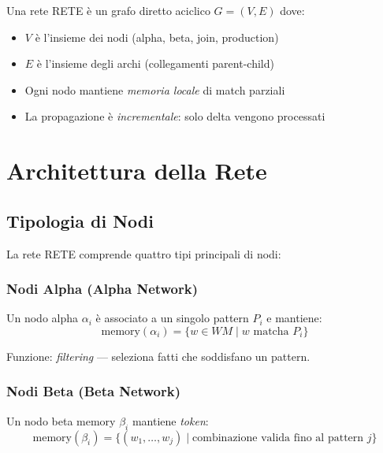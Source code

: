 \begin{definizione}
Una rete RETE è un grafo diretto aciclico $G = (V, E)$ dove:
\begin{itemize}
\item $V$ è l'insieme dei nodi (alpha, beta, join, production)
\item $E$ è l'insieme degli archi (collegamenti parent-child)
\item Ogni nodo mantiene \textit{memoria locale} di match parziali
\item La propagazione è \textit{incrementale}: solo delta vengono processati
\end{itemize}
\end{definizione}

\section{Architettura della Rete}

\subsection{Tipologia di Nodi}

La rete RETE comprende quattro tipi principali di nodi:

\subsubsection{Nodi Alpha (Alpha Network)}

\begin{definizione}
Un nodo alpha $\alpha_i$ è associato a un singolo pattern $P_i$ e mantiene:
\begin{equation}
\text{memory}(\alpha_i) = \{w \in WM \mid w \text{ matcha } P_i\}
\end{equation}
\end{definizione}

Funzione: \textit{filtering} --- seleziona fatti che soddisfano un pattern.

\subsubsection{Nodi Beta (Beta Network)}

\begin{definizione}
Un nodo beta memory $\beta_i$ mantiene \textit{token}:
\begin{equation}
\text{memory}(\beta_i) = \{(w_1, \ldots, w_j) \mid \text{combinazione valida fino al pattern } j\}
\end{equation}
\end{definizione}

